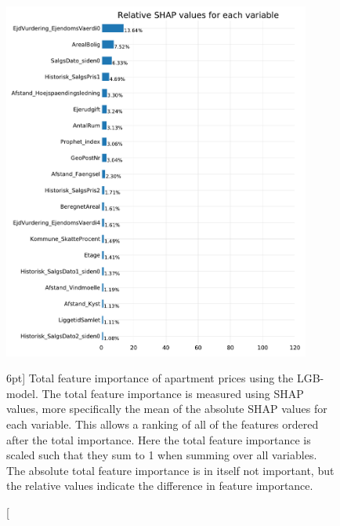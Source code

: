 \documentclass[a4paper, twoside, nobib]{tufte-book}
\begin{document}
\begin{figure}
  \includegraphics[width=0.9\textwidth, trim=0 0 0 40, clip]{figures/housing/Ejerlejlighed_v17_cut_all_Ncols_all_lgb_tight_SHAP_vals_summary_all.pdf}
  \caption[Total feature importance of apartment prices using LGB][6pt]
          {Total feature importance of apartment prices using the LGB-model. The total feature importance is measured using SHAP values, more specifically the mean of the absolute SHAP values for each variable. This allows a ranking of all of the features ordered after the total importance. Here the total feature importance is scaled such that they sum to 1 when summing over all variables. The absolute total feature importance is in itself not important, but the relative values indicate the difference in feature importance. 
          } 
  \label{fig:h:shap_overview_total}
\end{figure}
\end{document}
